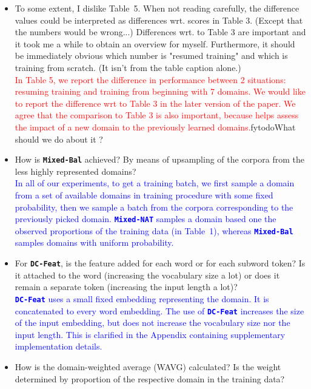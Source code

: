 \documentclass[12pt,times,a4paper,twoside]{article}
\theoremstyle{definition}
\newcommand{\system}[1]{\texttt{\textbf{#1}}}
\begin{document}
\begin{itemize}
\\
\item To some extent, I dislike Table~5. When not reading carefully, the difference values could be interpreted as differences wrt. scores in Table 3. (Except that the numbers would be wrong...) Differences wrt. to Table 3 are important and it took me a while to obtain an overview for myself. Furthermore, it should be immediately obvious which number is "resumed training" and which is training from scratch. (It isn't from the table caption alone.)
\\
\textcolor{red}{In Table 5, we report the difference in performance between 2 situations: resuming training and training from beginning with 7 domains. We would like to report the difference wrt to Table 3 in the later version of the paper. We agree that the comparison to Table 3 is also important, because helps assess the impact of a new domain to the previously learned domains.}fytodo{What should we do about it ?}
\\
\item How is \system{Mixed-Bal} achieved? By means of upsampling of the corpora from the less highly represented domains?
\\
\textcolor{blue}{In all of our experiments, to get a training batch, we first sample a domain from a set of available domains in training procedure with some fixed probability, then we sample a batch from the corpora corresponding to the previously picked domain. \system{Mixed-NAT} samples a domain based one the observed proportions of the training data (in Table~1), whereas \system{Mixed-Bal} samples domains with uniform probability.}
\\
\item For \system{DC-Feat}, is the feature added for each word or for each subword token? Is it attached to the word (increasing the vocabulary size a lot) or does it remain a separate token (increasing the input length a lot)?
\\
\textcolor{blue}{\system{DC-Feat} uses a small fixed embedding representing the domain. It is concatenated to every word embedding. The use of \system{DC-Feat} increases the size of the input embedding, but does not increase the vocabulary size nor the input length. This is clarified in the Appendix containing supplementary implementation details.}
\\
\item How is the domain-weighted average (WAVG) calculated? Is the weight determined by proportion of the respective domain in the training data?

\end{itemize}
\end{document}
